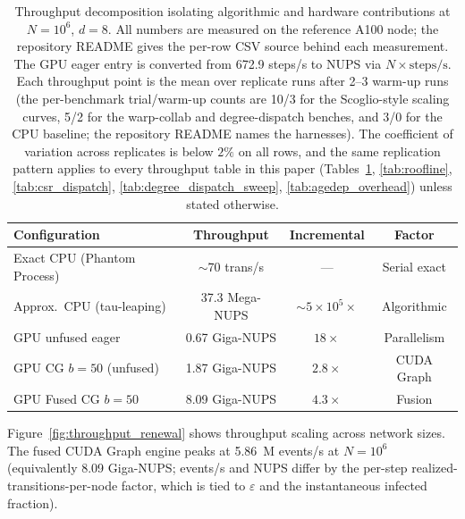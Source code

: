 \begin{table}[H]
\caption{Throughput decomposition isolating algorithmic and hardware contributions at $N=10^6$, $d=8$. All numbers are measured on the reference A100 node; the repository README gives the per-row CSV source behind each measurement. The GPU eager entry is converted from 672.9 steps/s to NUPS via $N \times \text{steps/s}$. Each throughput point is the mean over replicate runs after 2--3 warm-up runs (the per-benchmark trial/warm-up counts are 10/3 for the Scoglio-style scaling curves, 5/2 for the warp-collab and degree-dispatch benches, and 3/0 for the CPU baseline; the repository README names the harnesses). The coefficient of variation across replicates is below $2\%$ on all rows, and the same replication pattern applies to every throughput table in this paper (Tables~\ref{tab:renewal_layered}, \ref{tab:roofline}, \ref{tab:csr_dispatch}, \ref{tab:degree_dispatch_sweep}, \ref{tab:agedep_overhead}) unless stated otherwise.}
\label{tab:renewal_layered}
\centering
\begin{tabular*}{\linewidth}{@{}lccc@{}}
\toprule
\textbf{Configuration} & \textbf{Throughput} & \textbf{Incremental} & \textbf{Factor} \\
\midrule
Exact CPU (Phantom Process) & $\sim$70 trans/s        & ---                        & Serial exact \\
Approx.\ CPU (tau-leaping)  & 37.3 Mega-NUPS           & $\sim$$5 \times 10^5\times$ & Algorithmic \\
GPU unfused eager           & 0.67 Giga-NUPS           & $18\times$                  & Parallelism \\
GPU CG $b{=}50$ (unfused)   & 1.87 Giga-NUPS           & $2.8\times$                 & CUDA Graph \\
GPU Fused CG $b{=}50$       & 8.09 Giga-NUPS           & $4.3\times$                 & Fusion \\
\bottomrule
\end{tabular*}
\end{table}

Figure~\ref{fig:throughput_renewal} shows throughput scaling across network sizes. The fused CUDA Graph engine peaks at 5.86~M events/s at $N = 10^6$ (equivalently 8.09 Giga-NUPS; events/s and NUPS differ by the per-step realized-transitions-per-node factor, which is tied to $\varepsilon$ and the instantaneous infected fraction).

